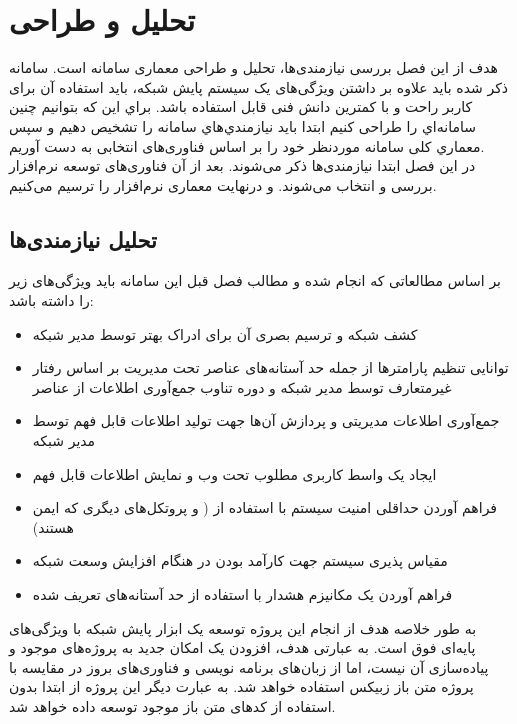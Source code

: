 \chapter{تحلیل و طراحی}

هدف از این فصل بررسی نیازمندی‌ها، تحلیل و طراحی معماری سامانه است. سامانه ذکر شده باید علاوه بر داشتن ویژگی‌های یک سیستم پایش شبکه، باید استفاده آن برای کاربر راحت و با کمترین دانش فنی قابل استفاده باشد. براي این که بتوانیم چنین سامانه‌اي را طراحی کنیم ابتدا باید نیازمندي‌هاي سامانه را تشخیص دهیم و سپس معماري کلی سامانه موردنظر خود را بر اساس فناوری‌های انتخابی به دست آوریم.
\\
در این فصل ابتدا نیازمندی‌ها ذکر می‌شوند. بعد از آن فناوری‌های توسعه نرم‌افزار بررسی و انتخاب می‌شوند. و درنهایت معماری نرم‌افزار را ترسیم می‌کنیم.



\section{تحلیل نیازمندی‌ها}

 بر اساس مطالعاتی که انجام شده و مطالب فصل قبل این سامانه باید ویژگی‌های زیر را داشته باشد:

\begin{itemize}
    \item کشف شبکه و ترسیم بصری آن برای ادراک بهتر توسط مدیر شبکه
    \item توانایی تنظیم پارامترها از جمله حد آستانه‌های عناصر تحت مدیریت بر اساس رفتار غیرمتعارف توسط مدیر شبکه و دوره تناوب جمع‌آوری اطلاعات از عناصر
    \item جمع‌آوری اطلاعات مدیریتی و پردازش آن‌ها جهت تولید اطلاعات قابل فهم توسط مدیر شبکه
    \item ایجاد یک واسط کاربری مطلوب تحت وب و نمایش اطلاعات قابل فهم 
    \item فراهم آوردن حداقلی امنیت سیستم با استفاده از ( و پروتکل‌های دیگری که ایمن هستند)
    \item مقیاس پذیری سیستم جهت کارآمد بودن در هنگام افزایش وسعت شبکه
    \item فراهم آوردن یک مکانیزم هشدار با استفاده از حد آستانه‌های تعریف شده
\end{itemize}

\newpage

به طور خلاصه هدف از انجام این پروژه توسعه یک ابزار پایش شبکه با ویژگی‌های پایه‌ای فوق است. به عبارتی هدف، افزودن یک امکان جدید به پروژه‌های موجود و پیاده‌سازی آن نیست، اما از زبان‌های برنامه نویسی و فناوری‌های بروز در مقایسه با پروژه متن باز زبیکس استفاده خواهد شد. به عبارت دیگر این پروژه از ابتدا بدون استفاده از کدهای متن باز موجود توسعه داده خواهد شد.

